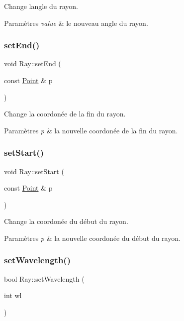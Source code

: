 Change l\textquotesingle{}angle du rayon. 
\begin{DoxyParams}{Paramètres}
{\em value} & le nouveau angle du rayon. \\
\hline
\end{DoxyParams}
\mbox{\label{class_ray_aa6637463a3ea6b87462ec81dcf78ae70}} 
\subsubsection{\texorpdfstring{setEnd()}{setEnd()}}
{\footnotesize\ttfamily void Ray\+::set\+End (\begin{DoxyParamCaption}\item[{const \mbox{\hyperlink{class_point}{Point}} \&}]{p }\end{DoxyParamCaption})}

Change la coordonée de la fin du rayon. 
\begin{DoxyParams}{Paramètres}
{\em p} & la nouvelle coordonée de la fin du rayon. \\
\hline
\end{DoxyParams}
\mbox{\label{class_ray_a9027a6d6c2929529399717932532ce25}} 
\subsubsection{\texorpdfstring{setStart()}{setStart()}}
{\footnotesize\ttfamily void Ray\+::set\+Start (\begin{DoxyParamCaption}\item[{const \mbox{\hyperlink{class_point}{Point}} \&}]{p }\end{DoxyParamCaption})}

Change la coordonée du début du rayon. 
\begin{DoxyParams}{Paramètres}
{\em p} & la nouvelle coordonée du début du rayon. \\
\hline
\end{DoxyParams}
\mbox{\label{class_ray_aaa0641bb04b0e2805f21b1788c5e3600}} 
\subsubsection{\texorpdfstring{setWavelength()}{setWavelength()}}
{\footnotesize\ttfamily bool Ray\+::set\+Wavelength (\begin{DoxyParamCaption}\item[{int}]{wl }\end{DoxyParamCaption})}

